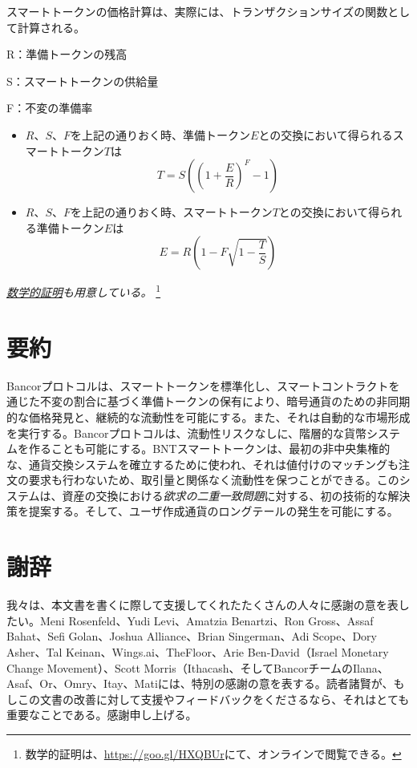 \documentclass{jsarticle}
\begin{document}
スマートトークンの価格計算は、実際には、トランザクションサイズの関数として計算される。

R：準備トークンの残高

S：スマートトークンの供給量

F：不変の準備率

\begin{itemize}
  \item $R$、$S$、$F$を上記の通りおく時、準備トークン$E$との交換において得られるスマートトークン$T$は
  \begin{equation*} \label{eq:price-discovery-formula}
    T = S((1 + \frac{E}{R})^F - 1)
  \end{equation*}

  \item $R$、$S$、$F$を上記の通りおく時、スマートトークン$T$との交換において得られる準備トークン$E$は
  \begin{equation*} \label{eq:price-discovery-formula}
    E = R(1 - F\sqrt{1 - \frac{T}{S}})
  \end{equation*}
\end{itemize}

\emph{\href{https://goo.gl/HXQBUr}{数学的証明}も用意している。}
\footnote{
  数学的証明は、\url{https://goo.gl/HXQBUr}にて、オンラインで閲覧できる。
}

\section{要約}

Bancorプロトコルは、スマートトークンを標準化し、スマートコントラクトを通じた不変の割合に基づく準備トークンの保有により、暗号通貨のための非同期的な価格発見と、継続的な流動性を可能にする。また、それは自動的な市場形成を実行する。Bancorプロトコルは、流動性リスクなしに、階層的な貨幣システムを作ることも可能にする。BNTスマートトークンは、最初の非中央集権的な、通貨交換システムを確立するために使われ、それは値付けのマッチングも注文の要求も行わないため、取引量と関係なく流動性を保つことができる。このシステムは、資産の交換における\emph{欲求の二重一致問題}に対する、初の技術的な解決策を提案する。そして、ユーザ作成通貨のロングテールの発生を可能にする。

\section{謝辞}

我々は、本文書を書くに際して支援してくれたたくさんの人々に感謝の意を表したい。Meni Rosenfeld、Yudi Levi、Amatzia Benartzi、Ron Gross、Assaf Bahat、Sefi Golan、Joshua Alliance、Brian Singerman、Adi Scope、Dory Asher、Tal Keinan、Wings.ai、TheFloor、Arie Ben-David（Israel Monetary Change Movement）、Scott Morris（Ithacash、そしてBancorチームのIlana、Asaf、Or、Omry、Itay、Matiには、特別の感謝の意を表する。読者諸賢が、もしこの文書の改善に対して支援やフィードバックをくださるなら、それはとても重要なことである。感謝申し上げる。
\end{document}
